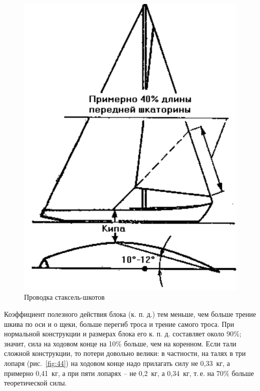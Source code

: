 \documentclass[a4paper, 12pt, twoside, final]{scrbook}
\begin{document}
\begin{figure}%
\begin{centering}
\includegraphics{pics/Provodka_staksel-shkotov}
\par\end{centering}

\protect\caption{\label{fig:46}Проводка стаксель-шкотов}

\end{figure}%


Коэффициент полезного действия блока (к. п. д.) тем меньше, чем больше
трение шкива по оси и о щеки, больше перегиб троса и трение самого
троса. При нормальной конструкции и размерах блока его к. п. д. составляет
около 90\%; значит, сила на ходовом конце на 10\% больше, чем на коренном.
Если тали сложной конструкции, то потери довольно велики: в частности,
на талях в три лопаря (рис.~\ref{fig:44})
на ходовом конце надо прилагать силу не 0,33~кг, а примерно 0,41~кг,
а при пяти лопарях \--- не 0,2~кг, а 0,34~кг, т.\,е. на 70\% больше теоретической
силы.
\end{document}
